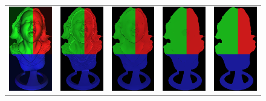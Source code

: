 \begin{figure}[!ht]
\centering
\setlength{\tabcolsep}{0.1em} %
 {\renewcommand{\arraystretch}{0.6}%
\begin{tabular}{c|c c c c}
   \includegraphics[height = 0.32\linewidth]{figures/methodology/ratio_syn_rgb.pdf} \hspace{0.1em}
   &\hspace{0.1em}
      \includegraphics[height = 0.32\linewidth]{figures/methodology/rgbd_rho_prone.pdf} &
      \includegraphics[height = 0.32\linewidth]{figures/methodology/rgbd_rho_simple.pdf}&
      \includegraphics[height = 0.32\linewidth]{figures/methodology/ratio_syn_albedoR.pdf}&
      \includegraphics[height = 0.32\linewidth]{figures/methodology/ratio_syn_albedoGT.pdf} 

\end{tabular}}
\end{figure}
